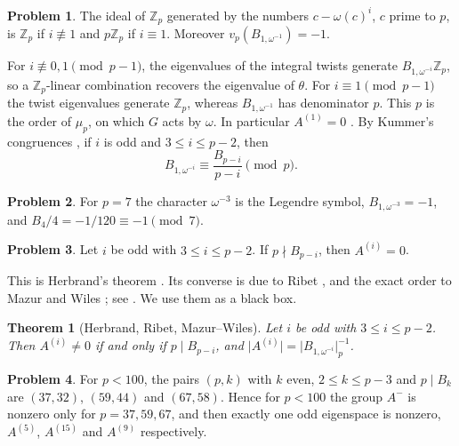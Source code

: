 \documentclass[reqno]{amsart}
\theoremstyle{definition}
\newtheorem{problem}{Problem}[section]
\theoremstyle{plain}
\newtheorem{theorem}{Theorem}[section]
\newcommand{\Z}{\mathbb{Z}}
\begin{document}
\begin{problem}\label{pr:gcd-c}
The ideal of \(\Z_p\) generated by the numbers \(c - \omega(c)^i\), \(c\) prime to \(p\), is \(\Z_p\) if \(i \not\equiv 1\) and \(p\Z_p\) if \(i \equiv 1\).  Moreover \(v_p(B_{1,\omega^{-1}}) = -1\).
\end{problem}

For \(i\not\equiv0,1\pmod{p-1}\), the eigenvalues of the integral twists generate \(B_{1,\omega^{-i}}\Z_p\), so a \(\Z_p\)-linear combination recovers the eigenvalue of \(\theta\).  For \(i\equiv1\pmod{p-1}\) the twist eigenvalues generate \(\Z_p\), whereas \(B_{1,\omega^{-1}}\) has denominator \(p\).  This \(p\) is the order of \(\mu_p\), on which \(G\) acts by \(\omega\).  In particular \(A^{(1)}=0\) \cite[Prop.~6.16]{Wa}.  By Kummer's congruences \cite[Ch.~5]{Wa}, if \(i\) is odd and \(3 \le i \le p-2\), then
\begin{equation}\label{eq:kummer}
  B_{1,\omega^{-i}} \equiv \frac{B_{p-i}}{p-i} \pmod p .
\end{equation}

\begin{problem}\label{pr:p7}
For \(p = 7\) the character \(\omega^{-3}\) is the Legendre symbol, \(B_{1,\omega^{-3}} = -1\), and \(B_4/4 = -1/120 \equiv -1 \pmod 7\).
\end{problem}

\begin{problem}\label{pr:herbrand}
Let \(i\) be odd with \(3 \le i \le p-2\).  If \(p \nmid B_{p-i}\), then \(A^{(i)} = 0\).
\end{problem}

This is Herbrand's theorem \cite[Thm.~6.17]{Wa}.  Its converse is due to Ribet \cite{Ri}, and the exact order to Mazur and Wiles \cite{MW}; see \cite[Ch.~15]{Wa}.  We use them as a black box.

\begin{theorem}[Herbrand, Ribet, Mazur--Wiles]\label{thm:HR}
Let \(i\) be odd with \(3 \le i \le p-2\).  Then \(A^{(i)} \ne 0\) if and only if \(p \mid B_{p-i}\), and \(\lvert A^{(i)} \rvert = \lvert B_{1,\omega^{-i}} \rvert_p^{-1}\).
\end{theorem}

\begin{problem}\label{pr:irregular}
For \(p < 100\), the pairs \((p, k)\) with \(k\) even, \(2 \le k \le p-3\) and \(p \mid B_k\) are \((37, 32)\), \((59, 44)\) and \((67, 58)\).  Hence for \(p < 100\) the group \(A^-\) is nonzero only for \(p = 37, 59, 67\), and then exactly one odd eigenspace is nonzero, \(A^{(5)}\), \(A^{(15)}\) and \(A^{(9)}\) respectively.
\end{problem}
\end{document}
